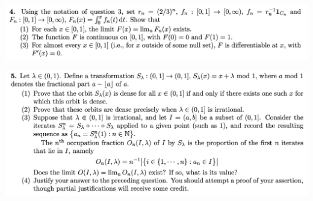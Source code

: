 \begin{mdframed}
\includegraphics[width=400pt]{img/analysis--berkeley-202a-8ce8.png}
\end{mdframed}




\begin{mdframed}
\includegraphics[width=400pt]{img/analysis--berkeley-202a-ccfa.png}
\end{mdframed}

